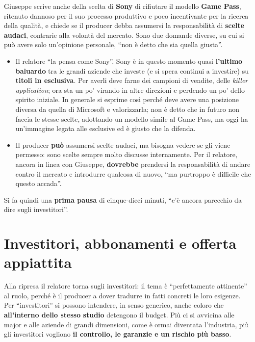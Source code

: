 Giuseppe scrive anche della scelta di \textbf{Sony} di rifiutare il modello
\textbf{Game Pass}, ritenuto dannoso per il suo processo produttivo e poco
incentivante per la ricerca della qualità, e chiede se il producer debba
assumersi la responsabilità di \textbf{scelte audaci}, contrarie alla volontà
del mercato. Sono due domande diverse, su cui si può avere solo un'opinione
personale, ``non è detto che sia quella giusta''.
\begin{itemize}
  \item Il relatore ``la pensa come Sony''. Sony è in questo momento quasi
        \textbf{l'ultimo baluardo} tra le grandi aziende che investe (e si spera
        continui a investire) su \textbf{titoli in esclusiva}. Per averli deve
        farne dei campioni di vendite, delle \emph{killer application}; ora sta
        un po' virando in altre direzioni e perdendo un po' dello spirito
        iniziale. In generale si esprime così perché deve avere una posizione
        diversa da quella di Microsoft e valorizzarla; non è detto che in futuro
        non faccia le stesse scelte, adottando un modello simile al Game Pass,
        ma oggi ha un'immagine legata alle esclusive ed è giusto che la difenda.
  \item Il producer \textbf{può} assumersi scelte audaci, ma bisogna vedere se
        gli viene permesso: sono scelte sempre molto discusse internamente. Per
        il relatore, ancora in linea con Giuseppe, \textbf{dovrebbe} prendersi
        la responsabilità di andare contro il mercato e introdurre qualcosa di
        nuovo, ``ma purtroppo è difficile che questo accada''.
\end{itemize}
Si fa quindi una \textbf{prima pausa} di cinque-dieci minuti, ``c'è ancora
parecchio da dire sugli investitori''.

\section{Investitori, abbonamenti e offerta appiattita}
\label{sec:z5-investitori-2}

Alla ripresa il relatore torna sugli investitori: il tema è
``perfettamente attinente'' al ruolo, perché è il producer a dover tradurre in
fatti concreti le loro esigenze. Per ``investitori'' si possono intendere, in
senso generico, anche coloro che \textbf{all'interno dello stesso studio}
detengono il budget. Più ci si avvicina alle major e alle aziende di grandi
dimensioni, come è ormai diventata l'industria, più gli investitori vogliono
\textbf{il controllo, le garanzie e un rischio più basso}.

